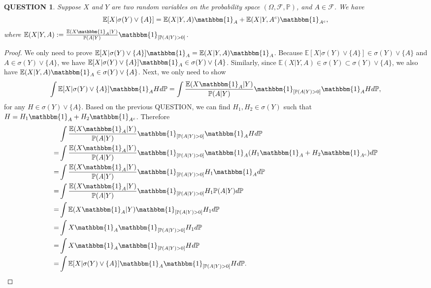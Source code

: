\documentclass[12pt]{article}
\renewcommand{\(}{\left(}%
\renewcommand{\)}{\right)}%
\renewcommand{\[}{\left[}%
\renewcommand{\]}{\right]}%
\newcommand{\p}{\mathbb{P}}
\newcommand{\f}{\mathscr{F}}
\newtheorem{question}{QUESTION}[section]}
\newtheorem{proof}{Proof.}}
\begin{document}
  \begin{question}
  	Suppose $X$ and $Y$ are two random variables on the probability space $(\Omega,\f,\p)$, and $A\in\f$. We have
  	\begin{equation*}
  		\mathbb{E}[X|\sigma(Y) \vee \{A\}]=\mathbb{E}(X|Y,A)\mathbbm{1}_A+\mathbb{E}(X|Y,A^c)\mathbbm{1}_{A^c},
  	\end{equation*} 
  	where $\mathbb{E}(X|Y,A):=\frac{\mathbb{E}(X\mathbbm{1}_A|Y)}{\p(A|Y)}\mathbbm{1}_{[\p(A|Y)>0]}$.
  \end{question}
  \begin{proof}
  	We only need to prove $\mathbb{E}[X|\sigma(Y) \vee \{A\}]\mathbbm{1}_A=\mathbb{E}(X|Y,A)\mathbbm{1}_A$. Because $\mathbb{E}[X|\sigma(Y) \vee \{A\}]\in \sigma(Y) \vee \{A\}$ and $A\in \sigma(Y) \vee \{A\}$, we have $\mathbb{E}[X|\sigma(Y) \vee \{A\}]\mathbbm{1}_A\in \sigma(Y) \vee \{A\}$. Similarly, since $\mathbb{E}(X|Y,A)\in \sigma(Y)\subset \sigma(Y) \vee \{A\}$, we also have $\mathbb{E}(X|Y,A)\mathbbm{1}_A\in \sigma(Y) \vee \{A\}$. Next, we only need to show 
  	\begin{equation*}
  		\int \mathbb{E}[X|\sigma(Y) \vee \{A\}]\mathbbm{1}_AHd\p=\int \frac{\mathbb{E}(X\mathbbm{1}_A|Y)}{\p(A|Y)}\mathbbm{1}_{[\p(A|Y)>0]}\mathbbm{1}_AHd\p,
  	\end{equation*}
  	for any $H\in \sigma(Y) \vee \{A\}$. Based on the previous QUESTION, we can find $H_1,H_2\in \sigma(Y)$ such that $H=H_1\mathbbm{1}_A+H_2\mathbbm{1}_{A^c}$. Therefore
  	\begin{align*}
  		&\int \frac{\mathbb{E}(X\mathbbm{1}_A|Y)}{\p(A|Y)}\mathbbm{1}_{[\p(A|Y)>0]}\mathbbm{1}_AHd\p\\
  			=&\int \frac{\mathbb{E}(X\mathbbm{1}_A|Y)}{\p(A|Y)}\mathbbm{1}_{[\p(A|Y)>0]}\mathbbm{1}_A(H_1\mathbbm{1}_A+H_2\mathbbm{1}_{A^c})d\p\\
  			=&\int \frac{\mathbb{E}(X\mathbbm{1}_A|Y)}{\p(A|Y)}\mathbbm{1}_{[\p(A|Y)>0]}H_1\mathbbm{1}_Ad\p\\
  			=&\int \frac{\mathbb{E}(X\mathbbm{1}_A|Y)}{\p(A|Y)}\mathbbm{1}_{[\p(A|Y)>0]}H_1\p(A|Y)d\p\\
  			=&\int \mathbb{E}(X\mathbbm{1}_A|Y)\mathbbm{1}_{[\p(A|Y)>0]}H_1d\p\\
  			=&\int X\mathbbm{1}_A\mathbbm{1}_{[\p(A|Y)>0]}H_1d\p\\
  			=&\int X\mathbbm{1}_A\mathbbm{1}_{[\p(A|Y)>0]}Hd\p\\
  			=&\int \mathbb{E}[X|\sigma(Y) \vee \{A\}]\mathbbm{1}_A\mathbbm{1}_{[\p(A|Y)>0]}Hd\p.
  	\end{align*}

\end{proof}
\end{document}
